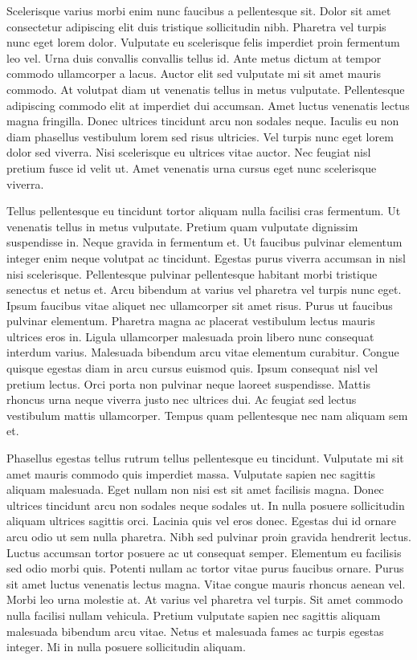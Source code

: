 \documentclass[11pt,a4paper]{article}
\begin{document}
Scelerisque varius morbi enim nunc faucibus a pellentesque sit. Dolor sit amet consectetur adipiscing elit duis tristique sollicitudin nibh. Pharetra vel turpis nunc eget lorem dolor. Vulputate eu scelerisque felis imperdiet proin fermentum leo vel. Urna duis convallis convallis tellus id. Ante metus dictum at tempor commodo ullamcorper a lacus. Auctor elit sed vulputate mi sit amet mauris commodo. At volutpat diam ut venenatis tellus in metus vulputate. Pellentesque adipiscing commodo elit at imperdiet dui accumsan. Amet luctus venenatis lectus magna fringilla. Donec ultrices tincidunt arcu non sodales neque. Iaculis eu non diam phasellus vestibulum lorem sed risus ultricies. Vel turpis nunc eget lorem dolor sed viverra. Nisi scelerisque eu ultrices vitae auctor. Nec feugiat nisl pretium fusce id velit ut. Amet venenatis urna cursus eget nunc scelerisque viverra.

Tellus pellentesque eu tincidunt tortor aliquam nulla facilisi cras fermentum. Ut venenatis tellus in metus vulputate. Pretium quam vulputate dignissim suspendisse in. Neque gravida in fermentum et. Ut faucibus pulvinar elementum integer enim neque volutpat ac tincidunt. Egestas purus viverra accumsan in nisl nisi scelerisque. Pellentesque pulvinar pellentesque habitant morbi tristique senectus et netus et. Arcu bibendum at varius vel pharetra vel turpis nunc eget. Ipsum faucibus vitae aliquet nec ullamcorper sit amet risus. Purus ut faucibus pulvinar elementum. Pharetra magna ac placerat vestibulum lectus mauris ultrices eros in. Ligula ullamcorper malesuada proin libero nunc consequat interdum varius. Malesuada bibendum arcu vitae elementum curabitur. Congue quisque egestas diam in arcu cursus euismod quis. Ipsum consequat nisl vel pretium lectus. Orci porta non pulvinar neque laoreet suspendisse. Mattis rhoncus urna neque viverra justo nec ultrices dui. Ac feugiat sed lectus vestibulum mattis ullamcorper. Tempus quam pellentesque nec nam aliquam sem et.

Phasellus egestas tellus rutrum tellus pellentesque eu tincidunt. Vulputate mi sit amet mauris commodo quis imperdiet massa. Vulputate sapien nec sagittis aliquam malesuada. Eget nullam non nisi est sit amet facilisis magna. Donec ultrices tincidunt arcu non sodales neque sodales ut. In nulla posuere sollicitudin aliquam ultrices sagittis orci. Lacinia quis vel eros donec. Egestas dui id ornare arcu odio ut sem nulla pharetra. Nibh sed pulvinar proin gravida hendrerit lectus. Luctus accumsan tortor posuere ac ut consequat semper. Elementum eu facilisis sed odio morbi quis. Potenti nullam ac tortor vitae purus faucibus ornare. Purus sit amet luctus venenatis lectus magna. Vitae congue mauris rhoncus aenean vel. Morbi leo urna molestie at. At varius vel pharetra vel turpis. Sit amet commodo nulla facilisi nullam vehicula. Pretium vulputate sapien nec sagittis aliquam malesuada bibendum arcu vitae. Netus et malesuada fames ac turpis egestas integer. Mi in nulla posuere sollicitudin aliquam.
\end{document}
